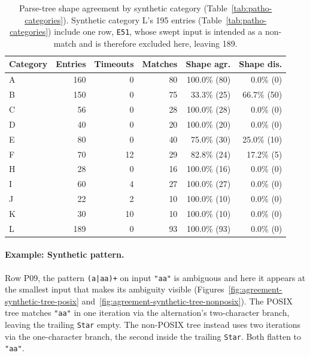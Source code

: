 \begin{table}[H]
\centering
\small
\setlength{\tabcolsep}{3pt}
\renewcommand{\arraystretch}{0.92}
\begin{tabular*}{\textwidth}{@{\extracolsep{\fill}} lrrrrr}
\hline
Category & Entries & Timeouts & Matches & Shape agr. & Shape dis. \\
\hline
A & 160 &  0 & 80 & 100.0\% (80) &  0.0\% (0) \\
B & 150 &  0 & 75 &  33.3\% (25) & 66.7\% (50) \\
C &  56 &  0 & 28 & 100.0\% (28) &  0.0\% (0) \\
D &  40 &  0 & 20 & 100.0\% (20) &  0.0\% (0) \\
E &  80 &  0 & 40 &  75.0\% (30) & 25.0\% (10) \\
F &  70 & 12 & 29 &  82.8\% (24) & 17.2\% (5) \\
H &  28 &  0 & 16 & 100.0\% (16) &  0.0\% (0) \\
I &  60 &  4 & 27 & 100.0\% (27) &  0.0\% (0) \\
J &  22 &  2 & 10 & 100.0\% (10) &  0.0\% (0) \\
K &  30 & 10 & 10 & 100.0\% (10) &  0.0\% (0) \\
L & 189 &  0 & 93 & 100.0\% (93) &  0.0\% (0) \\
\hline
\end{tabular*}
\renewcommand{\arraystretch}{1}
\caption{Parse-tree shape agreement by synthetic
category (Table~\ref{tab:patho-categories}).
Synthetic category L's 195 entries (Table~\ref{tab:patho-categories})
include one row, \texttt{E51}, whose swept input is intended as
a non-match and is therefore excluded here, leaving 189.}
\label{tab:agreement-patho-categories}
\end{table}

%

\paragraph{Example: Synthetic pattern.}
Row P09, the pattern \texttt{(a|aa)+} on input \texttt{"aa"} is ambiguous
and here it appears at the smallest input that makes its ambiguity visible
(Figures~\ref{fig:agreement-synthetic-tree-posix}
and~\ref{fig:agreement-synthetic-tree-nonposix}).
The POSIX tree matches \texttt{"aa"} in one iteration via the
alternation's two-character branch, leaving the trailing \texttt{Star}
empty. The non-POSIX tree instead uses two iterations via the
one-character branch, the second inside the trailing \texttt{Star}.
Both flatten to \texttt{"aa"}.

